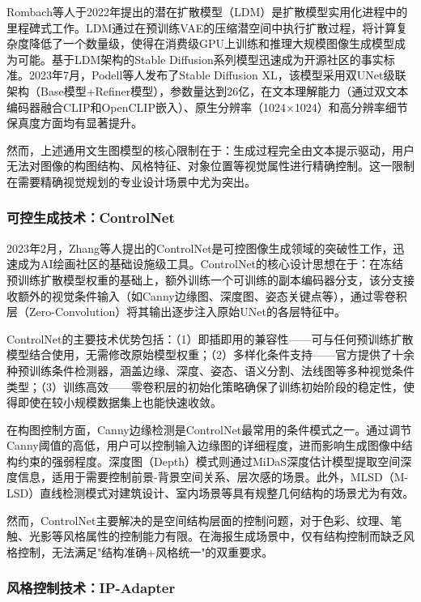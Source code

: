 \documentclass[12pt,a4paper]{ctexart}
\newcommand{\sdxl}{Stable Diffusion XL}
\newcommand{\controlnet}{ControlNet}
\begin{document}
Rombach等人于2022年提出的潜在扩散模型（LDM）是扩散模型实用化进程中的里程碑式工作。LDM通过在预训练VAE的压缩潜空间中执行扩散过程，将计算复杂度降低了一个数量级，使得在消费级GPU上训练和推理大规模图像生成模型成为可能。基于LDM架构的Stable Diffusion系列模型迅速成为开源社区的事实标准。2023年7月，Podell等人发布了\sdxl{}，该模型采用双UNet级联架构（Base模型+Refiner模型），参数量达到26亿，在文本理解能力（通过双文本编码器融合CLIP和OpenCLIP嵌入）、原生分辨率（1024$\times$1024）和高分辨率细节保真度方面均有显著提升。

然而，上述通用文生图模型的核心限制在于：生成过程完全由文本提示驱动，用户无法对图像的构图结构、风格特征、对象位置等视觉属性进行精确控制。这一限制在需要精确视觉规划的专业设计场景中尤为突出。

\subsubsection{可控生成技术：ControlNet}

2023年2月，Zhang等人提出的\controlnet{}是可控图像生成领域的突破性工作，迅速成为AI绘画社区的基础设施级工具。\controlnet{}的核心设计思想在于：在冻结预训练扩散模型权重的基础上，额外训练一个可训练的副本编码器分支，该分支接收额外的视觉条件输入（如Canny边缘图、深度图、姿态关键点等），通过零卷积层（Zero-Convolution）将其输出逐步注入原始UNet的各层特征中。

\controlnet{}的主要技术优势包括：（1）即插即用的兼容性——可与任何预训练扩散模型结合使用，无需修改原始模型权重；（2）多样化条件支持——官方提供了十余种预训练条件检测器，涵盖边缘、深度、姿态、语义分割、法线图等多种视觉条件类型；（3）训练高效——零卷积层的初始化策略确保了训练初始阶段的稳定性，使得即使在较小规模数据集上也能快速收敛。

在构图控制方面，Canny边缘检测是\controlnet{}最常用的条件模式之一。通过调节Canny阈值的高低，用户可以控制输入边缘图的详细程度，进而影响生成图像中结构约束的强弱程度。深度图（Depth）模式则通过MiDaS深度估计模型提取空间深度信息，适用于需要控制前景-背景空间关系、层次感的场景。此外，MLSD（M-LSD）直线检测模式对建筑设计、室内场景等具有规整几何结构的场景尤为有效。

然而，\controlnet{}主要解决的是空间结构层面的控制问题，对于色彩、纹理、笔触、光影等风格属性的控制能力有限。在海报生成场景中，仅有结构控制而缺乏风格控制，无法满足"结构准确+风格统一"的双重要求。

\subsubsection{风格控制技术：IP-Adapter}
\end{document}
